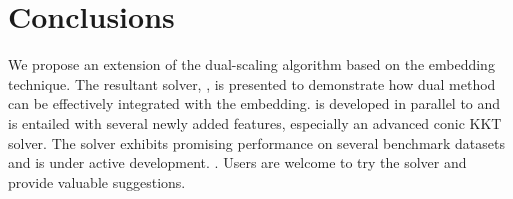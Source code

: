 \section{Conclusions}

We propose an extension of the dual-scaling algorithm based on
the embedding technique. The resultant solver, , is presented to
demonstrate how dual method can be effectively integrated with the embedding. 
 is developed in parallel to  and
is entailed with several newly added features, especially an advanced conic KKT solver. The solver
exhibits promising performance on several benchmark datasets and is under
active development. . Users are welcome to try the solver and provide valuable suggestions.